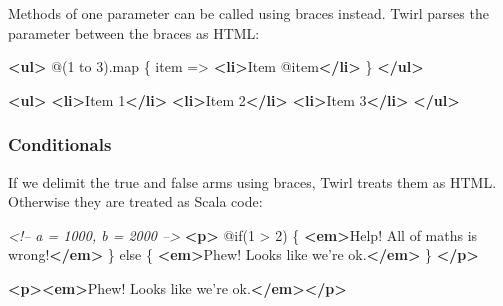 \documentclass[oneside,11pt,a4paper,]{book}
\newenvironment{Shaded}{\begin{snugshade}}{\end{snugshade}}
\newcommand{\KeywordTok}[1]{\textcolor[rgb]{0.13,0.29,0.53}{\textbf{{#1}}}}
\newcommand{\CommentTok}[1]{\textcolor[rgb]{0.56,0.35,0.01}{\textit{{#1}}}}
\newcommand{\NormalTok}[1]{{#1}}
\begin{document}
Methods of one parameter can be called using braces instead. Twirl
parses the parameter between the braces as HTML:

\begin{multicols}{2}

\begin{Shaded}
\begin{Highlighting}[]
\KeywordTok{<ul>}
  \NormalTok{@(1 to 3).map \{ item =>}
    \KeywordTok{<li>}\NormalTok{Item @item}\KeywordTok{</li>}
  \NormalTok{\}}
\KeywordTok{</ul>}
\end{Highlighting}
\end{Shaded}

\columnbreak

\begin{Shaded}
\begin{Highlighting}[]
\KeywordTok{<ul>}
  \KeywordTok{<li>}\NormalTok{Item 1}\KeywordTok{</li>}
  \KeywordTok{<li>}\NormalTok{Item 2}\KeywordTok{</li>}
  \KeywordTok{<li>}\NormalTok{Item 3}\KeywordTok{</li>}
\KeywordTok{</ul>}
\end{Highlighting}
\end{Shaded}

\end{multicols}

\subsubsection{Conditionals}\label{conditionals}

If we delimit the true and false arms using braces, Twirl treats them as
HTML. Otherwise they are treated as Scala code:

\begin{multicols}{2}

\begin{Shaded}
\begin{Highlighting}[]
\CommentTok{<!-- a = 1000, b = 2000 -->}
\KeywordTok{<p>}
  \NormalTok{@if(1 > 2) \{}
    \KeywordTok{<em>}\NormalTok{Help! All of maths is wrong!}\KeywordTok{</em>}
  \NormalTok{\} else \{}
    \KeywordTok{<em>}\NormalTok{Phew! Looks like we're ok.}\KeywordTok{</em>}
  \NormalTok{\}}
\KeywordTok{</p>}
\end{Highlighting}
\end{Shaded}

\columnbreak

\begin{Shaded}
\begin{Highlighting}[]
\KeywordTok{<p><em>}\NormalTok{Phew! Looks like we're ok.}\KeywordTok{</em></p>}
\end{Highlighting}
\end{Shaded}

\end{multicols}
\end{document}
